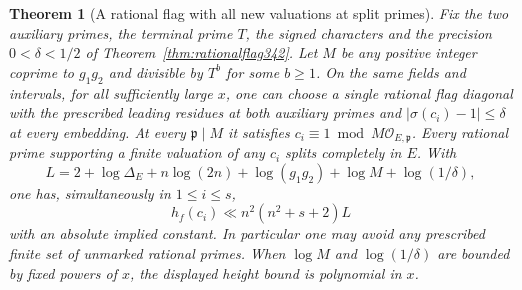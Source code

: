 \documentclass[a4paper,11pt]{article}
\newtheorem{theorem}[proposition]{Theorem}
\theoremstyle{definition}
\theoremstyle{remark}
\numberwithin{equation}{section}
\begin{document}
\begin{theorem}[A rational flag with all new valuations at split primes]\leavevmode\label{thm:splitflag343}
Fix the two auxiliary primes, the terminal prime $T$, the signed
characters and the precision $0<\delta<1/2$ of
Theorem~\ref{thm:rationalflag342}. Let $M$ be any positive integer
coprime to $g_1g_2$ and divisible by $T^b$ for some $b\ge1$.
On the same fields and intervals, for all sufficiently large $x$,
one can choose a single rational flag diagonal with the prescribed
leading residues at both auxiliary primes and
$|\sigma(c_i)-1|\le\delta$ at every embedding. At every
$\mathfrak p\mid M$ it satisfies $c_i\equiv1\bmod M\mathcal O_{E,\mathfrak p}$.
Every rational prime supporting a finite valuation of any $c_i$
splits completely in $E$. With
\[
 L=2+\log\Delta_E+n\log(2n)+\log(g_1g_2)+\log M+\log(1/\delta),
\]
one has, simultaneously in $1\le i\le s$,
\[
                   h_f(c_i)\ll n^2(n^2+s+2)L
\]
with an absolute implied constant. In particular one may avoid any
prescribed finite set of unmarked rational primes. When $\log M$ and
$\log(1/\delta)$ are bounded by fixed powers of $x$, the displayed
height bound is polynomial in $x$.
\end{theorem}
\end{document}
